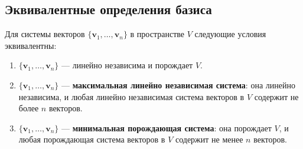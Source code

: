 \documentclass[10pt]{article}
\begin{document}
\subsection*{Эквивалентные определения базиса}

\begin{theorem}\label{th:basis}
Для системы векторов \(\{\mathbf{v}_1,\dots,\mathbf{v}_n\}\) в пространстве \(V\) следующие условия эквивалентны:
\begin{enumerate}
    \item \(\{\mathbf{v}_1,\dots,\mathbf{v}_n\}\) — линейно независима и порождает \(V\).
    \item \(\{\mathbf{v}_1,\dots,\mathbf{v}_n\}\) — \textbf{максимальная линейно независимая система}: она линейно независима, и любая линейно независимая система векторов в \(V\) содержит не более \(n\) векторов.
    \item \(\{\mathbf{v}_1,\dots,\mathbf{v}_n\}\) — \textbf{минимальная порождающая система}: она порождает \(V\), и любая порождающая система векторов в \(V\) содержит не менее \(n\) векторов.
\end{enumerate}
\end{theorem}
\end{document}
